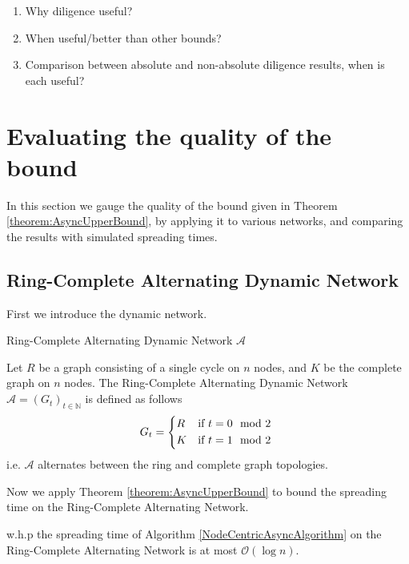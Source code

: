 \begin{enumerate}
	\item Why diligence useful?
	\item When useful/better than other bounds?
	\item Comparison between absolute and non-absolute  diligence results, when is each useful?
\end{enumerate}

\section{Evaluating the quality of the bound}

In this section we gauge the quality of the bound given in Theorem \ref{theorem:AsyncUpperBound}, by applying it to various networks, and comparing the results with simulated spreading times.

\subsection{Ring-Complete Alternating Dynamic Network}

First we introduce the dynamic network. %

\begin{definition}
	Ring-Complete Alternating Dynamic Network $\mathcal{A}$

	\noindent
	Let $R$ be a graph consisting of a single cycle on $n$ nodes, and $K$ be the complete graph on $n$ nodes. The Ring-Complete Alternating Dynamic Network $\mathcal{A} = (G_t)_{t \in \mathbb{N}}$ is defined as follows %
	\begin{equation*}
		G_t = 
		\begin{cases*}
			R & if $t = 0 \mod 2$ \\
			K & if $t = 1 \mod 2$
		  \end{cases*}
	\end{equation*}
	i.e. $\mathcal{A}$ alternates between the ring and complete graph topologies.
\end{definition}


Now we apply Theorem \ref{theorem:AsyncUpperBound} to bound the spreading time on the Ring-Complete Alternating Network.

\begin{theorem}\label{theorem:ringCompleteAsyncBound}
	w.h.p the spreading time of Algorithm \ref{NodeCentricAsyncAlgorithm} on the Ring-Complete Alternating Network is at most $\mathcal{O}(\log n)$. 
\end{theorem}

